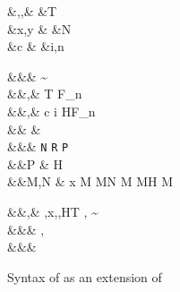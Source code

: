 \documentclass[manuscript,screen,nonacm]{acmart}
\begin{document}
  \begin{figure}[h]
    \begin{syntax}
     &\alpha,\beta,\Co  &\qquad{} &T \\
     &x,y                  &\qquad{}       &N \\
     &c                &\qquad{}        &i,n \in {} \\
  \end{syntax}
  \begin{syntax}
         &&\kappa       \bnfeq& \star \bnfor \kappa \to \kappa \bnfor \sigma \sim \tau\\
         &&\tau,\sigma  \bnfeq& \alpha \bnfor T \bnfor \tau \to \tau \bnfor \tau\App\tau \bnfor \Forall {\alpha\co\kappa} \tau \bnfor F_n\\
     &&\nu,\Co      \bnfeq& c \bnfor {}\tau \bnfor \Sym\Co \bnfor \trans\nu\Co %
                                        \bnfor \Forall {\alpha\co\kappa} \Co \bnfor \Co\At\tau %
                                        \bnfor \nu\App\Co \bnfor \Left \Co \bnfor \Right \Co \bnfor \nth i \Co \bnfor H\App\many\Co \bnfor F_n\many\Co \bnfor \sub \Co
                                        \\  %
     && \phi \bnfeq& \tau \bnfor \Co\\
               &&\rho  \bnfeq& \texttt{N} \bnfor \texttt{R} \bnfor \texttt{P}\\
      &&P    \bnfeq& H\App \many{\alpha\co\kappa} \\
         &&M,N  \bnfeq& x \bnfor  {} M \bnfor M\App N \bnfor \TLam{\tau\co\kappa} M \bnfor M\App \tau \bnfor H \bnfor \Case M  \bnfor \Cast \Tm \Co
    \end{syntax}
    \begin{syntax}
       &&\TEnv,\Delta \bnfeq& \empt \bnfor \TEnv,x\co\tau \bnfor \TEnv,\alpha\co\kappa \bnfor \TEnv,H\co T \bnfor \TEnv, \Co \co \tau\sim\sigma\\
       &&\REnv        \bnfeq& \empt \bnfor \REnv, \alpha\co\rho\\
      &&\Subst       \bnfeq& \empt \bnfor \Set{\many{\alpha \mapsto \tau}}
  \end{syntax}

    \caption{Syntax of \SFR as an extension of \SFC}
    \label{fig:sfr-syntax}
  \end{figure}
\end{document}

